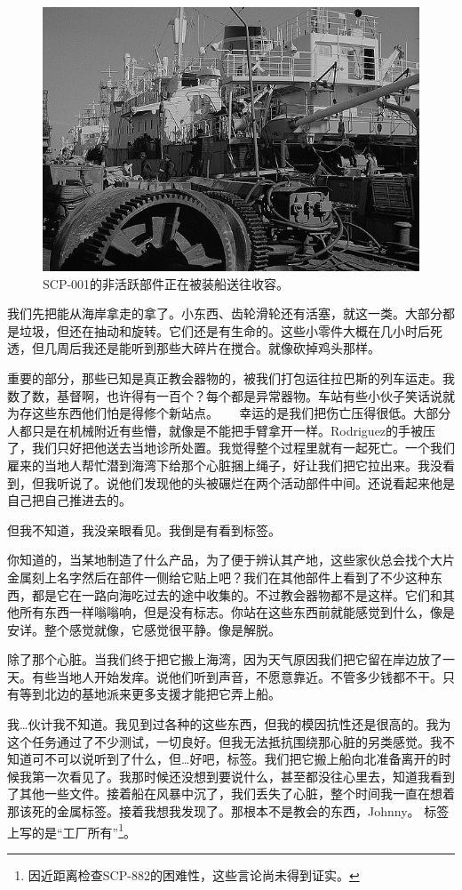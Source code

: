 
\begin{figure}[H]
	\centering
	\includegraphics[width=0.5\linewidth]{images/SCP.001.the.broken.god.9.jpg}
	\caption*{SCP-001的非活跃部件正在被装船送往收容。}
\end{figure}

\begin{scpbox}

我们先把能从海岸拿走的拿了。小东西、齿轮滑轮还有活塞，就这一类。大部分都是垃圾，但还在抽动和旋转。它们还是有生命的。这些小零件大概在几小时后死透，但几周后我还是能听到那些大碎片在搅合。就像砍掉鸡头那样。

重要的部分，那些已知是真正教会器物的，被我们打包运往拉巴斯的列车运走。我数了数，基督啊，也许得有一百个？每个都是异常器物。车站有些小伙子笑话说就为存这些东西他们怕是得修个新站点。
　
幸运的是我们把伤亡压得很低。大部分人都只是在机械附近有些懵，就像是不能把手臂拿开一样。Rodriguez的手被压了，我们只好把他送去当地诊所处置。我觉得整个过程里就有一起死亡。一个我们雇来的当地人帮忙潜到海湾下给那个心脏捆上绳子，好让我们把它拉出来。我没看到，但我听说了。说他们发现他的头被碾烂在两个活动部件中间。还说看起来他是自己把自己推进去的。

但我不知道，我没亲眼看见。我倒是有看到标签。

你知道的，当某地制造了什么产品，为了便于辨认其产地，这些家伙总会找个大片金属刻上名字然后在部件一侧给它贴上吧？我们在其他部件上看到了不少这种东西，都是它在一路向海吃过去的途中收集的。不过教会器物都不是这样。它们和其他所有东西一样嗡嗡响，但是没有标志。你站在这些东西前就能感觉到什么，像是安详。整个感觉就像，它感觉很平静。像是解脱。

除了那个心脏。当我们终于把它搬上海湾，因为天气原因我们把它留在岸边放了一天。有些当地人开始发痒。说他们听到声音，不愿意靠近。不管多少钱都不干。只有等到北边的基地派来更多支援才能把它弄上船。

我…伙计我不知道。我见到过各种的这些东西，但我的模因抗性还是很高的。我为这个任务通过了不少测试，一切良好。但我无法抵抗围绕那心脏的另类感觉。我不知道可不可以说听到了什么，但…好吧，标签。我们把它搬上船向北准备离开的时候我第一次看见了。我那时候还没想到要说什么，甚至都没往心里去，知道我看到了其他一些文件。接着船在风暴中沉了，我们丢失了心脏，整个时间我一直在想着那该死的金属标签。接着我想我发现了。那根本不是教会的东西，Johnny。
标签上写的是“工厂所有”\footnote{因近距离检查SCP-882的困难性，这些言论尚未得到证实。}。

\end{scpbox}

